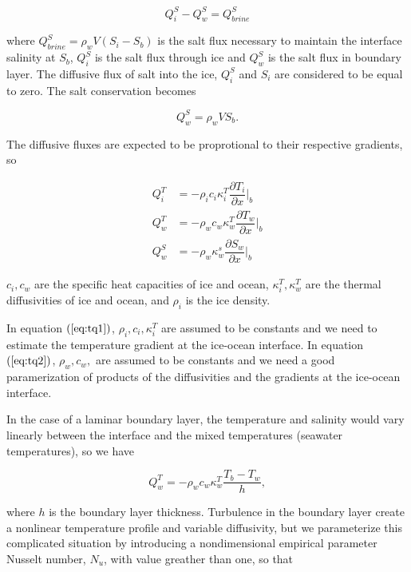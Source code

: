 \documentclass[11pt,a4paper]{article}
\begin{document}
		\begin{equation}
			Q_i^S - Q_w^S = Q^S_{brine}
		\end{equation}
		
		where $Q_{brine}^S = \rho_wV(S_i-S_b)$ is the salt flux necessary to maintain the interface salinity at $S_b$, $Q_i^S$ is the salt flux through ice and $Q_w^S$ is the salt flux in boundary layer. The diffusive flux of salt into the ice, $Q_i^S$ and $S_i$ are considered to be equal to zero.  The salt conservation becomes 
		
		\begin{equation}
			\label{eq:4}
			Q_w^S = \rho_wVS_b.
		\end{equation}

		The diffusive fluxes are expected to be proprotional to their respective gradients, so
		
		\begin{align}
			\label{eq:tq1}
			Q_i^T &= -\rho_ic_i\kappa_i^T\dfrac{\partial T_i}{\partial x}\bigg|_b\\		
			\label{eq:tq2}	
			Q_w^T& = -\rho_wc_w\kappa_w^T\dfrac{\partial T_w}{\partial x}\bigg|_b\\
			\label{eq:tq3} 
			Q_w^S& = -\rho_w\kappa_w^s\dfrac{\partial S_w}{\partial x}\bigg|_b
		\end{align}
	
	
		$c_i, c_w$ are the specific heat capacities of ice and ocean, $\kappa_i^T, \kappa_w^T$ are the thermal diffusivities of ice and ocean, and $\rho_i$ is the ice density.
		
		In equation $(\ref{eq:tq1})$, $\rho_i, c_i, \kappa_i^T$ are assumed to be constants and we need to estimate the temperature gradient at the ice-ocean interface. In equation $(\ref{eq:tq2})$, $\rho_w, c_w,$ are assumed to be constants and we need a good paramerization of  products of the diffusivities and the gradients at the ice-ocean interface.
		
		In the case of a laminar boundary layer, the temperature and salinity would vary linearly between the interface and the mixed temperatures (seawater temperatures)\cite{holland1999modeling}, so we have
		
		\begin{equation}
			Q_w^T = -\rho_wc_w\kappa_w^T\dfrac{T_b-T_w}{h},
		\end{equation}
	
		where $h$ is the boundary layer thickness. Turbulence in the boundary layer create a nonlinear temperature profile and variable diffusivity, but we parameterize this complicated situation by introducing a nondimensional empirical parameter Nusselt number, $N_u$, with value greather than one, so that
		
\end{document}
